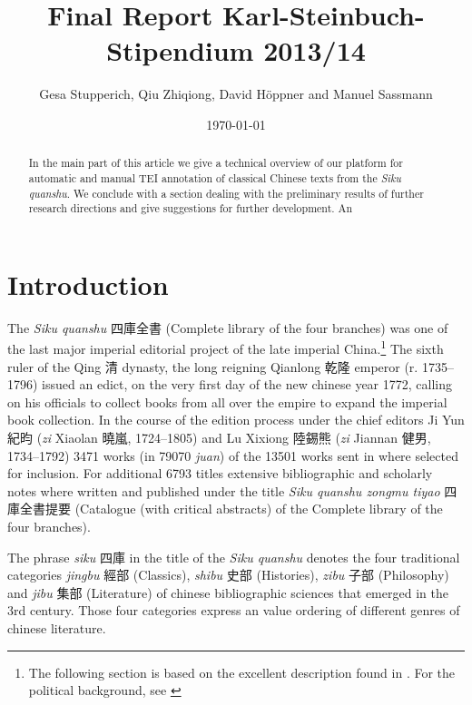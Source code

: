 \documentclass[12pt, draft]{article}
\begin{document}
\title{Final Report Karl-Steinbuch-Stipendium 2013/14}
\author{Gesa Stupperich, Qiu Zhiqiong, David Höppner and Manuel Sassmann}
\date{\today}
\maketitle

\begin{abstract}
In the main part of this article we
give a technical overview of
our platform for automatic and manual
TEI annotation of classical Chinese texts from the \emph{Siku quanshu}.
We conclude with a section dealing with the preliminary results of further research directions and give suggestions for further development. An
\end{abstract}

\section{Introduction}

The \emph{Siku quanshu} 四庫全書 (Complete library of the four branches)
was one of the last major imperial editorial project of the
late imperial China.\footnote{The following section is based on the excellent
description found in \cite[945-954]{Wilkinson:2012}. For the political
background, see \cite{Guy:1987}}
The sixth ruler of the Qing 清 dynasty, the long reigning
Qianlong 乾隆 emperor (r. 1735--1796) issued an edict,
on the very first
day of the new chinese year 1772, calling on his officials to collect books from
all over the empire to expand the imperial book collection.
In the course of the edition process under the
chief editors Ji Yun 紀昀 (\emph{zi} Xiaolan 曉嵐, 1724--1805) and Lu Xixiong 陸錫熊
(\emph{zi} Jiannan 健男, 1734--1792) 3471 works (in 79070 \emph{juan})
of the 13501 works sent in where selected for inclusion.
For additional 6793 titles extensive bibliographic and scholarly
notes where written and published under the title \emph{Siku quanshu zongmu tiyao}
四庫全書提要 (Catalogue (with critical abstracts) of the Complete library of the 
four branches).

The phrase \emph{siku} 四庫 in the title of the \emph{Siku quanshu}
denotes the four traditional categories \emph{jingbu} 經部
(Classics), \emph{shibu} 史部 (Histories), \emph{zibu} 子部 (Philosophy)
and \emph{jibu} 集部 (Literature)
of chinese bibliographic sciences that emerged in the 3rd century.
Those four categories express an value ordering of
different genres of chinese literature.
\end{document}
